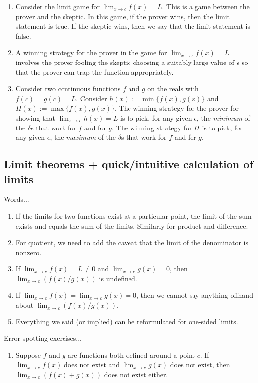 \documentclass[10pt]{amsart}
\begin{document}
\begin{enumerate}
\item Consider the limit game for $\lim_{x \to c} f(x) = L$. This is a
  game between the prover and the skeptic. In this game, if the prover
  wins, then the limit statement is true. If the skeptic wins, then we
  say that the limit statement is false.
\item A winning strategy for the prover in the game for $\lim_{x \to
  c} f(x) = L$ involves the prover fooling the skeptic choosing a
  suitably large value of $\epsilon$ so that the prover can trap the
  function appropriately.
\item Consider two continuous functions $f$ and $g$ on the reals with
  $f(c) = g(c) = L$. Consider $h(x) := \min \{ f(x), g(x) \}$ and
  $H(x) := \max \{ f(x),g(x) \}$. The winning strategy for the prover
  for showing that $\lim_{x \to c} h(x) = L$ is to pick, for any given
  $\epsilon$, the {\em minimum} of the $\delta$s that work for $f$ and
  for $g$. The winning strategy for $H$ is to pick, for any given
  $\epsilon$, the {\em maximum} of the $\delta$s that work for $f$ and
  for $g$.
\end{enumerate}

\subsection{Limit theorems + quick/intuitive calculation of limits}

Words...

\begin{enumerate}
\item If the limits for two functions exist at a particular point, the
  limit of the sum exists and equals the sum of the limits. Similarly
  for product and difference.
\item For quotient, we need to add the caveat that the limit of the
  denominator is nonzero.
\item If $\lim_{x \to c} f(x) = L \ne 0$ and $\lim_{x \to c} g(x) =
  0$, then $\lim_{x \to c} (f(x)/g(x))$ is undefined.
\item If $\lim_{x \to c} f(x) = \lim_{x \to c} g(x) = 0$, then we
  cannot say anything offhand about $\lim_{x \to c} (f(x)/g(x))$.
\item Everything we said (or implied) can be reformulated for
  one-sided limits.
\end{enumerate}

Error-spotting exercises...

\begin{enumerate}
\item Suppose $f$ and $g$ are functions both defined around a point
  $c$. If $\lim_{x \to c} f(x)$ does not exist and $\lim_{x \to c}
  g(x)$ does not exist, then $\lim_{x \to c} (f(x) + g(x))$ does not
  exist either.
\end{enumerate}
\end{document}
